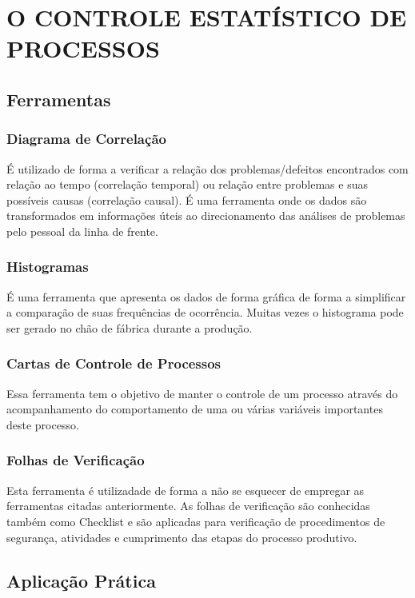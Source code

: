 \chapter{O CONTROLE ESTATÍSTICO DE PROCESSOS}
\label{chap:controle_estatistico_de_processos}



\section{Ferramentas}
\label{sec:controle_estatistico_sec1}

\subsection{Diagrama de Correlação}
É utilizado de forma a verificar a relação dos problemas/defeitos encontrados com relação ao tempo (correlação temporal) ou relação entre problemas e suas possíveis causas (correlação causal). É uma ferramenta onde os dados são transformados em informações úteis ao direcionamento das análises de problemas pelo pessoal da linha de frente.

\subsection{Histogramas}
É uma ferramenta que apresenta os dados de forma gráfica de forma a simplificar a comparação de suas frequências de ocorrência. Muitas vezes o histograma pode ser gerado no chão de fábrica durante a produção.

\subsection{Cartas de Controle de Processos}
Essa ferramenta tem o objetivo de manter o controle de um processo através do acompanhamento do comportamento de uma ou várias variáveis importantes deste processo.

\subsection{Folhas de Verificação}
Esta ferramenta é utilizadade de forma a não se esquecer de empregar as ferramentas citadas anteriormente. As folhas de verificação são conhecidas também como Checklist e são aplicadas para verificação de procedimentos de segurança, atividades e cumprimento das etapas do processo produtivo.




\section{Aplicação Prática}
\label{sec:controle_estatistico_aplicacao}
